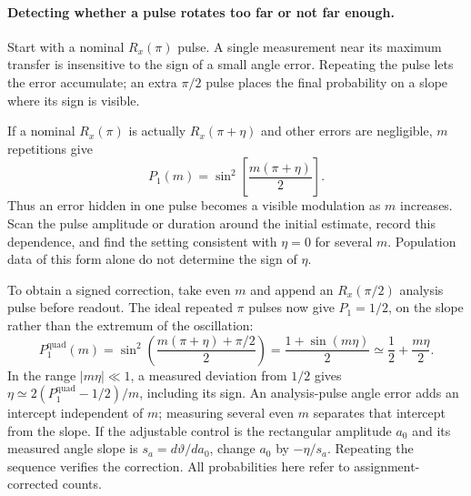 \paragraph{Detecting whether a pulse rotates too far or not far enough.}
Start with a nominal $R_x(\pi)$ pulse. A single measurement near its
maximum transfer is insensitive to the sign of a small angle error.
Repeating the pulse lets the error accumulate; an extra $\pi/2$
pulse places the final probability on a slope where its sign is visible.

If a nominal $R_x(\pi)$ is actually $R_x(\pi+\eta)$ and other
errors are negligible, $m$ repetitions give
\begin{equation}
 P_1(m)=\sin^2\!\left[\frac{m(\pi+\eta)}2\right].
 \label{eq:calibration-angle-amplification}
\end{equation}
Thus an error hidden in one pulse becomes a visible modulation as
$m$ increases. Scan the pulse amplitude or duration around the
initial estimate, record this dependence, and find the setting
consistent with $\eta=0$ for several $m$. Population data of this
form alone do not determine the sign of $\eta$.

To obtain a signed correction, take even $m$ and append an
$R_x(\pi/2)$ analysis pulse before readout. The ideal repeated
$\pi$ pulses now give $P_1=1/2$, on the slope rather than the
extremum of the oscillation:
\begin{equation}
 P_1^{\mathrm{quad}}(m)
 =\sin^2\left(\frac{m(\pi+\eta)+\pi/2}{2}\right)
 =\frac{1+\sin(m\eta)}2
 \simeq\frac12+\frac{m\eta}{2}.
 \label{eq:calibration-signed-angle-error}
\end{equation}
In the range $|m\eta|\ll1$, a measured deviation from $1/2$ gives
$\eta\simeq2(P_1^{\mathrm{quad}}-1/2)/m$, including its sign.
An analysis-pulse angle error adds an intercept independent of
$m$; measuring several even $m$ separates that intercept from
the slope. If the adjustable control is the rectangular amplitude
$a_0$ and its measured angle slope is $s_a=d\vartheta/da_0$,
change $a_0$ by $-\eta/s_a$. Repeating the sequence verifies the correction.
All probabilities here refer to assignment-corrected counts.


